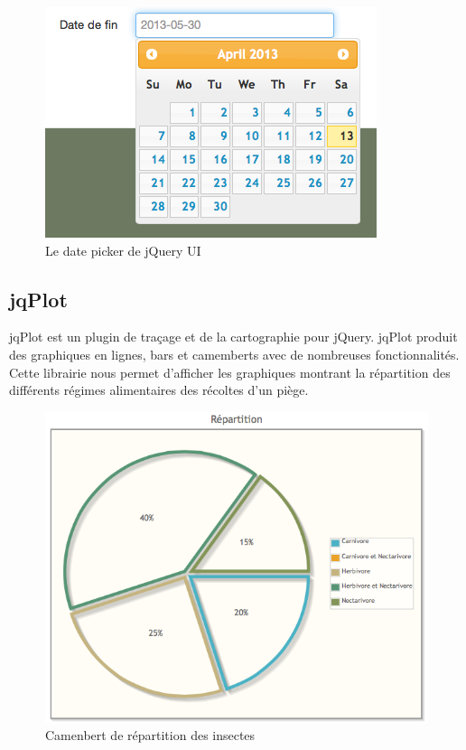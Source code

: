 \documentclass[twoside]{EPURapport}
\begin{document}
		\begin{figure}[hbtp]
			\centering
			\includegraphics[scale=0.5]{images/lib-jquery_datePicker.png}
			\caption{Le date picker de jQuery UI}
		\end{figure}
	
		\subsection{jqPlot}
		\label{lib:jqplot}
		jqPlot est un plugin de traçage et de la cartographie pour jQuery. jqPlot produit des graphiques en lignes, bars et camemberts avec de nombreuses fonctionnalités. Cette librairie nous permet d'afficher les graphiques montrant la répartition des différents régimes alimentaires des récoltes d'un piège.
		
		\begin{figure}[hbtp]
			\centering
			\includegraphics[scale=0.5]{images/lib-jqplot.png}
			\caption{Camenbert de répartition des insectes}
		\end{figure}
		
\end{document}
